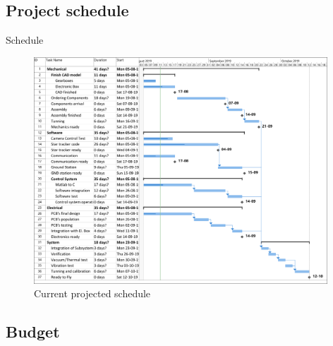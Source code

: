 \documentclass[11pt, aspectratio=169]{beamer}
\begin{document}
	\subsection{Project schedule}
		\begin{frame}{Schedule}
			\begin{figure}
				\centering
				\includegraphics[width=0.98\textwidth, height=0.8\textheight]{figures/Management/Gantt_2.pdf}
				\caption{Current projected schedule}
				\label{img::Gantt}
			\end{figure}
		\end{frame}
\subsection{Budget}
\end{document}
